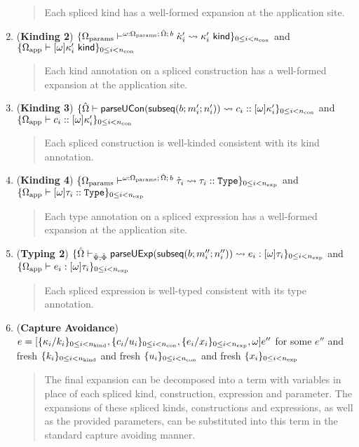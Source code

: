 \begin{theorem}
\begin{enumerate}
		\begin{quote}
			Each spliced kind has a well-formed expansion at the application site.
		\end{quote}
	\item (\textbf{Kinding 2}) $\{\Omega_\text{params} \vdash^{\omega : \Omega_\text{params};\,{\hat\Omega};\,b} {\grave\kappa}'_i \leadsto \kappa'_i~\mathsf{kind}\}_{0 \leq i < n_\text{con}}$ and $\{\Omega_\text{app} \vdash [\omega]\kappa'_i~\mathsf{kind}\}_{0 \leq i < n_\text{con}}$
		\begin{quote}
			Each kind annotation on a spliced construction has a well-formed expansion at the application site.
		\end{quote}
	\item (\textbf{Kinding 3}) $\{{\hat\Omega} \vdash \mathsf{parseUCon}(\mathsf{subseq}(b; m'_i; n'_i)) \leadsto c_i :: [\omega]\kappa'_i\}_{0 \leq i < n_\text{con}}$ and $\{\Omega_\text{app} \vdash c_i :: [\omega]\kappa'_i\}_{0 \leq i < n_\text{con}}$
		\begin{quote}
			Each spliced construction is well-kinded consistent with its kind annotation.
		\end{quote}
	\item (\textbf{Kinding 4}) $\{\Omega_\text{params} \vdash^{\omega : \Omega_\text{params};\,{\hat\Omega};\,b} \grave{\tau}_i \leadsto \tau_i :: \texttt{Type}\}_{0 \leq i < n_\text{exp}}$ and $\{\Omega_\text{app} \vdash [\omega]\tau_i :: \texttt{Type}\}_{0 \leq i < n_\text{exp}}$
		\begin{quote}
			Each type annotation on a spliced expression has a well-formed expansion at the application site.
		\end{quote}
	\item (\textbf{Typing 2}) $\{{\hat\Omega} \vdash_{\hat{\Psi}; \hat\Phi} \mathsf{parseUExp}(\mathsf{subseq}(b; m''_i; n''_i)) \leadsto e_i : [\omega]\tau_i\}_{0 \leq i < n_\text{exp}}$ and $\{\Omega_\text{app} \vdash e_i : [\omega]\tau_i\}_{0 \leq i < n_\text{exp}}$
		\begin{quote}
			Each spliced expression is well-typed consistent with its type annotation.
		\end{quote}
	\item (\textbf{Capture Avoidance}) $e = [\{\kappa_i/k_i\}_{0 \leq i < n_\text{kind}}, \{c_i/u_i\}_{0 \leq i < n_\text{con}}, \{e_i/x_i\}_{0 \leq i < n_\text{exp}}, \omega]e''$ for some $e''$ and fresh $\{k_i\}_{0 \leq i < n_\text{kind}}$ and fresh $\{u_i\}_{0 \leq i < n_\text{con}}$ and fresh $\{x_i\}_{0 \leq i < n_\text{exp}}$
		\begin{quote}
			The final expansion can be decomposed into a term with variables in place of each spliced kind, construction, expression and parameter. The expansions of these spliced kinds, constructions and expressions, as well as the provided parameters, can be substituted into this term in the standard capture avoiding manner.
		\end{quote}

\end{enumerate}
\end{theorem}
